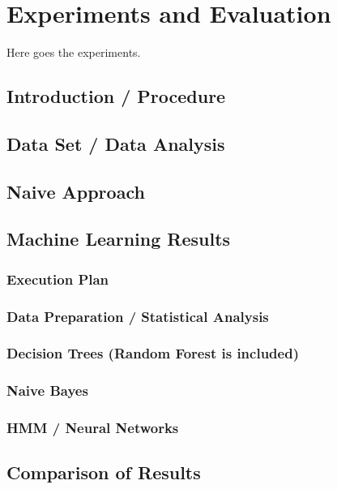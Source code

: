 \section{Experiments and Evaluation}
\label{sec:experiments}

Here goes the experiments.


\subsection{Introduction / Procedure}

\subsection{Data Set / Data Analysis}
\label{subsec:data_set}

\subsection{Naive Approach}


\subsection{Machine Learning Results}

\subsubsection{Execution Plan}
\subsubsection{Data Preparation / Statistical Analysis}
\subsubsection{Decision Trees (Random Forest is included)}
\subsubsection{Naive Bayes}
\subsubsection{HMM / Neural Networks}

\subsection{Comparison of Results}